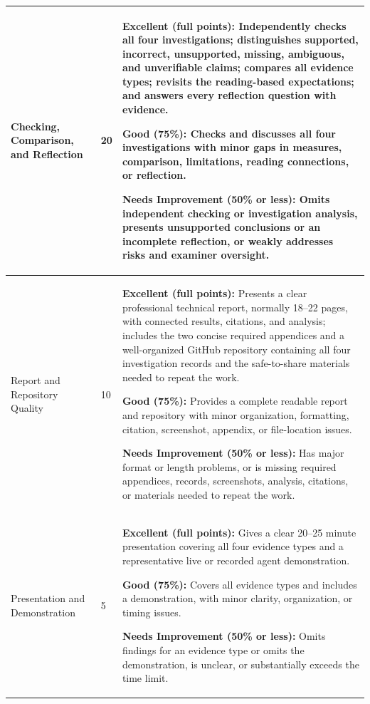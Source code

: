 \documentclass[12pt,letterpaper]{article}
\begin{document}
\begin{longtable}{|p{}|p{}|p{}|}
    \hline
    Checking, Comparison, and Reflection         & 20              & \textbf{Excellent (full points):} Independently checks all four investigations; distinguishes supported, incorrect, unsupported, missing, ambiguous, and unverifiable claims; compares all evidence types; revisits the reading-based expectations; and answers every reflection question with evidence. \par\medskip \textbf{Good (75\%):} Checks and discusses all four investigations with minor gaps in measures, comparison, limitations, reading connections, or reflection. \par\medskip \textbf{Needs Improvement (50\% or less):} Omits independent checking or investigation analysis, presents unsupported conclusions or an incomplete reflection, or weakly addresses risks and examiner oversight.                                          \\
    \hline
    Report and Repository Quality                & 10              & \textbf{Excellent (full points):} Presents a clear professional technical report, normally 18--22 pages, with connected results, citations, and analysis; includes the two concise required appendices and a well-organized GitHub repository containing all four investigation records and the safe-to-share materials needed to repeat the work. \par\medskip \textbf{Good (75\%):} Provides a complete readable report and repository with minor organization, formatting, citation, screenshot, appendix, or file-location issues. \par\medskip \textbf{Needs Improvement (50\% or less):} Has major format or length problems, or is missing required appendices, records, screenshots, analysis, citations, or materials needed to repeat the work. \\
    \hline
    Presentation and Demonstration               & 5               & \textbf{Excellent (full points):} Gives a clear 20--25 minute presentation covering all four evidence types and a representative live or recorded agent demonstration. \par\medskip \textbf{Good (75\%):} Covers all evidence types and includes a demonstration, with minor clarity, organization, or timing issues. \par\medskip \textbf{Needs Improvement (50\% or less):} Omits findings for an evidence type or omits the demonstration, is unclear, or substantially exceeds the time limit.                                                                                                                                                                                                                                                        \\

\end{longtable}
\end{document}
